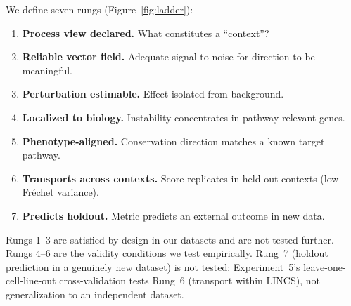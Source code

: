 \documentclass{article}
\begin{document}
We define seven rungs (Figure~\ref{fig:ladder}):

\begin{enumerate}
  \item \textbf{Process view declared.} What constitutes a ``context''?
  \item \textbf{Reliable vector field.} Adequate signal-to-noise for
    direction to be meaningful.
  \item \textbf{Perturbation estimable.} Effect isolated from background.
  \item \textbf{Localized to biology.} Instability concentrates in
    pathway-relevant genes.
  \item \textbf{Phenotype-aligned.} Conservation direction matches a
    known target pathway.
  \item \textbf{Transports across contexts.} Score replicates in held-out
    contexts (low Fr\'echet variance).
  \item \textbf{Predicts holdout.} Metric predicts an external outcome
    in new data.
\end{enumerate}

Rungs 1--3 are satisfied by design in our datasets and are not tested
further. Rungs 4--6 are the validity conditions we test empirically.
Rung~7 (holdout prediction in a genuinely new dataset) is not tested:
Experiment~5's leave-one-cell-line-out cross-validation tests Rung~6
(transport within LINCS), not generalization to an independent dataset.
\end{document}
